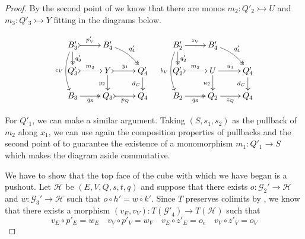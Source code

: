 \documentclass[a4paper,UKenglish,cleveref,pdftex,thm-restate,numberwithinsect]{lipics-v2021}
\def\B{\textbf {\textup{B}}}
\newcommand{\commentato}[1]{ {} }
\newcommand{\mto}{\rightarrowtail}
\begin{document}
\begin{proof}
	By the second point of  we know that there are monos $m_2\colon Q'_2\mto U$ and $m_3\colon Q'_3\mto Y$  fitting in the diagrams below.
	
	\[\xymatrix@R=15pt{B'_3 \ar@{>>}[d]^{q'_3} \ar@/_.3cm/[dd]_{c_V} \ar@{>->}[r]^{p'_V}& B'_4 \ar@/^.2cm/@{>>}[dr]^{q'_4} & & B'_2 \ar[r]^{z_V} \ar@{>>}[d]^{q'_2} \ar@/_.3cm/[dd]_{b_V}& B'_4 \ar@/^.2cm/@{>>}[dr]^{q'_4}\\ Q'_3 \ar@{>.>}[r]^{m_3}& Y  \ar@{>->}[r]^{y_1} \ar[d]_{y_2}& Q'_4 \ar[d]_{d_C}& Q'_2 \ar@{>.>}[r]^{m_2} & U \ar[d]_{u_2} \ar[r]^{u_1} & Q'_4 \ar[d]_{d_C} \\ B_3 \ar@{>>}[r]_{q_3} & Q_3 \ar@{>->}[r]_{p_Q} & Q_4 &B_2 \ar@{>>}[r]_{q_3} & Q_2 \ar[r]_{z_Q} & Q_4}\]

	\noindent 
	\parbox{8.5cm}{
	For $Q'_1$, we can make a similar argument. Taking $(S, s_1, s_2)$ as the pullback of $m_2$ along $x_1$, we can use again the composition properties of pullbacks and the second point of  to guarantee the existence of a monomorphism $m_1\colon Q'_1\to S$ which makes the diagram aside commutative.}\hfill
	\parbox{4cm}{}

We have to show that the top face of the cube with which we have began is a pushout. Let $\mathcal{H}$ be $(E, V, Q, s, t, q)$ and suppose that there exists  $o\colon  \mathcal{G}_2' \to \mathcal{H}$ and $w\colon  \mathcal{G}_3' \to \mathcal{H}$ such that $o \circ h' = w \circ k'$. Since $T$ preserves colimits by , we know that there exists a morphism $(v_E, v_V)\colon T(\mathcal{G'}_4)\to T(\mathcal{H})$ such that
\[v_E\circ p'_E=w_E \quad v_V\circ p'_V=w_V \quad v_E\circ z'_E=o_e \quad v_V\circ z'_V=o_V\]

\commentato{\xymatrix@C=10pt@R=6pt{
		&B_1'\ar@{>>}[dd]|\hole_(.65){q_1'}\ar@{>->}[rr]^{h_V'} \ar[dl]_(.6){k_V'} && B_2' \ar@{>>}[dd]|\hole_(.65){q_2'} \ar[dl]_(.6){z_V'}\ar[dr]^{o_V}\\
		B_3'  \ar@{>>}[dd]_{q_3'}\ar@{>->}[rr]^(.7){p_V'} & & B_4' \ar@{>>}[dd]_(.3){q_4'} \ar[rr]^(.7){v_V}&&  V\ar[dd]^{q}\\
		&Q_1'\ar@{>->}[rr]|\hole^(.65){h'_Q} \ar[dl]_{k'_Q} && Q_2' \ar[dl]^(.4){z_Q'}\ar[dr]^{o_Q}\\
		Q'_3 \ar@{>->}[rr]_{p_Q'} & & Q'_4\ar@{.>}[rr]_{v_C} && Q
}}



\end{proof}
\end{document}
